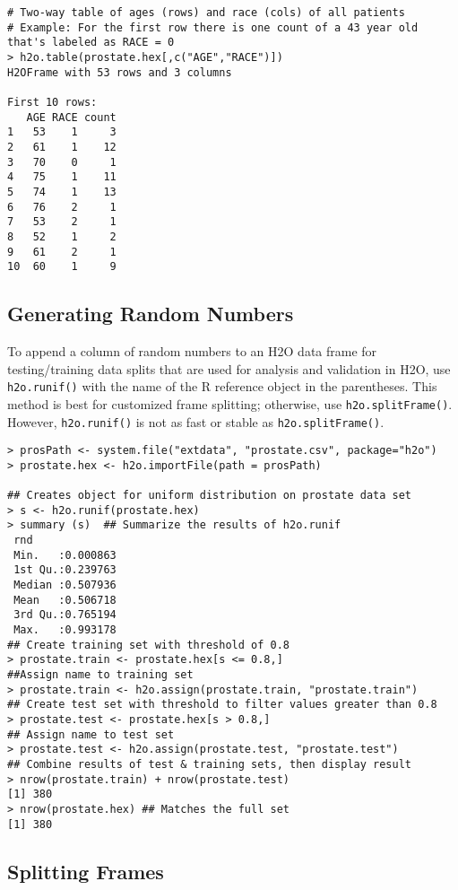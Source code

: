 {{\begin{lstlisting}[style=R]
# Two-way table of ages (rows) and race (cols) of all patients
# Example: For the first row there is one count of a 43 year old that's labeled as RACE = 0
> h2o.table(prostate.hex[,c("AGE","RACE")])
H2OFrame with 53 rows and 3 columns

First 10 rows:
   AGE RACE count
1   53    1     3
2   61    1    12
3   70    0     1
4   75    1    11
5   74    1    13
6   76    2     1
7   53    2     1
8   52    1     2
9   61    2     1
10  60    1     9
\end{lstlisting}

\subsection{Generating Random Numbers}

To append a column of random numbers to an H2O data frame for testing/training data splits that are used for analysis and validation in H2O, use {\texttt{h2o.runif()}} with the name of the R reference object in the parentheses. This method is best for customized frame splitting; otherwise, use {\texttt{h2o.splitFrame()}}. However, {\texttt{h2o.runif()}} is not as fast or stable as {\texttt{h2o.splitFrame()}}.

\waterExampleInR
\medskip
\begin{lstlisting}[style=R]
> prosPath <- system.file("extdata", "prostate.csv", package="h2o")
> prostate.hex <- h2o.importFile(path = prosPath)

## Creates object for uniform distribution on prostate data set
> s <- h2o.runif(prostate.hex)
> summary (s)  ## Summarize the results of h2o.runif
 rnd               
 Min.   :0.000863  
 1st Qu.:0.239763  
 Median :0.507936  
 Mean   :0.506718  
 3rd Qu.:0.765194  
 Max.   :0.993178  
## Create training set with threshold of 0.8
> prostate.train <- prostate.hex[s <= 0.8,]
##Assign name to training set
> prostate.train <- h2o.assign(prostate.train, "prostate.train")
## Create test set with threshold to filter values greater than 0.8
> prostate.test <- prostate.hex[s > 0.8,]
## Assign name to test set
> prostate.test <- h2o.assign(prostate.test, "prostate.test")
## Combine results of test & training sets, then display result
> nrow(prostate.train) + nrow(prostate.test)
[1] 380
> nrow(prostate.hex) ## Matches the full set
[1] 380
\end{lstlisting}
 

\subsection{Splitting Frames}


}}
